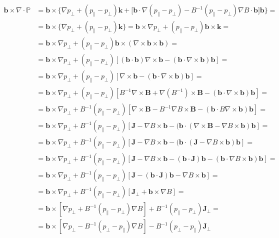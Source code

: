 \begin{equation*}
  \begin{split}
    \mathbf{b}\times\nabla\cdot\mathbb{P}&=\mathbf{b}\times\bigg\{\nabla p_\perp+(p_\parallel-p_\perp)\mathbf{k}+\Big[\mathbf{b}\cdot\nabla(p_\parallel-p_\perp)-B^{-1}(p_\parallel-p_\perp)\nabla B\cdot\mathbf{b}\Big]\mathbf{b}\bigg\}=\\
    &=\mathbf{b}\times\big\{\nabla p_\perp+(p_\parallel-p_\perp)\mathbf{k}\big\}=\mathbf{b}\times\nabla p_\perp+(p_\parallel-p_\perp)\mathbf{b}\times\mathbf{k}=\\
    &=\mathbf{b}\times\nabla p_\perp+(p_\parallel-p_\perp)\mathbf{b}\times(\nabla\times\mathbf{b}\times\mathbf{b})=\\
    &=\mathbf{b}\times\nabla p_\perp+(p_\parallel-p_\perp)[(\mathbf{b}\cdot\mathbf{b})\nabla\times\mathbf{b}-(\mathbf{b}\cdot\nabla\times\mathbf{b})\mathbf{b}]=\\
    &=\mathbf{b}\times\nabla p_\perp+(p_\parallel-p_\perp)[\nabla\times\mathbf{b}-(\mathbf{b}\cdot\nabla\times\mathbf{b})\mathbf{b}]=\\
    &=\mathbf{b}\times\nabla p_\perp+(p_\parallel-p_\perp)[B^{-1}\nabla\times\mathbf{B}+\nabla(B^{-1})\times\mathbf{B}-(\mathbf{b}\cdot\nabla\times\mathbf{b})\mathbf{b}]=\\
    &=\mathbf{b}\times\nabla p_\perp+B^{-1}(p_\parallel-p_\perp)[\nabla\times\mathbf{B}-B^{-1}\nabla B\times\mathbf{B}-(\mathbf{b}\cdot B\nabla\times\mathbf{b})\mathbf{b}]=\\
    &=\mathbf{b}\times\nabla p_\perp+B^{-1}(p_\parallel-p_\perp)[\mathbf{J}-\nabla B\times\mathbf{b} -(\mathbf{b}\cdot (\nabla\times\mathbf{B}-\nabla B\times\mathbf{b})\mathbf{b}]=\\
    &=\mathbf{b}\times\nabla p_\perp+B^{-1}(p_\parallel-p_\perp)[\mathbf{J}-\nabla B\times\mathbf{b} -(\mathbf{b}\cdot (\mathbf{J}-\nabla B\times\mathbf{b})\mathbf{b}]=\\
    &=\mathbf{b}\times\nabla p_\perp+B^{-1}(p_\parallel-p_\perp)[\mathbf{J}-\nabla B\times\mathbf{b} -(\mathbf{b}\cdot\mathbf{J})\mathbf{b}-(\mathbf{b}\cdot\nabla B\times\mathbf{b})\mathbf{b}]=\\
    &=\mathbf{b}\times\nabla p_\perp+B^{-1}(p_\parallel-p_\perp)[\mathbf{J}-(\mathbf{b}\cdot\mathbf{J})\mathbf{b}-\nabla B\times\mathbf{b}]=\\
    &=\mathbf{b}\times\nabla p_\perp+B^{-1}(p_\parallel-p_\perp)[\mathbf{J}_\perp+\mathbf{b}\times\nabla B]=\\
    &=\mathbf{b}\times[\nabla p_\perp+B^{-1}(p_\parallel-p_\perp)\nabla B]+B^{-1}(p_\parallel-p_\perp)\mathbf{J}_\perp=\\
    &=\mathbf{b}\times[\nabla p_\perp-B^{-1}(p_\perp-p_\parallel)\nabla B]-B^{-1}(p_\perp-p_\parallel)\mathbf{J}_\perp\\
  \end{split}
\end{equation*}
